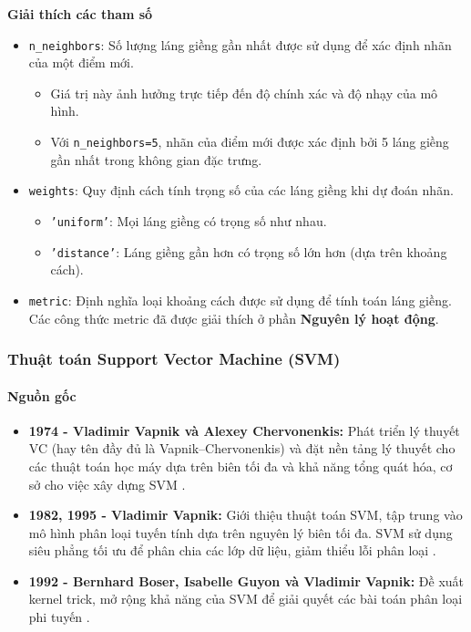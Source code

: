 \documentclass[a4paper,12pt]{article}
\begin{document}
\noindent \textbf{Giải thích các tham số}
\begin{itemize}
    \item \texttt{n\_neighbors}: Số lượng láng giềng gần nhất được sử dụng để xác định nhãn của một điểm mới.
    \begin{itemize}
        \item Giá trị này ảnh hưởng trực tiếp đến độ chính xác và độ nhạy của mô hình.
        \item Với \texttt{n\_neighbors=5}, nhãn của điểm mới được xác định bởi 5 láng giềng gần nhất trong không gian đặc trưng.
    \end{itemize}

    \item \texttt{weights}: Quy định cách tính trọng số của các láng giềng khi dự đoán nhãn.
    \begin{itemize}
        \item \texttt{'uniform'}: Mọi láng giềng có trọng số như nhau.
        \item \texttt{'distance'}: Láng giềng gần hơn có trọng số lớn hơn (dựa trên khoảng cách).
    \end{itemize}
    
    \item \texttt{metric}: Định nghĩa loại khoảng cách được sử dụng để tính toán láng giềng. Các công thức metric đã được giải thích ở phần \textbf{Nguyên lý hoạt động}.
\end{itemize}

\subsubsection{Thuật toán Support Vector Machine (SVM)}

\paragraph{Nguồn gốc}
\begin{itemize}
    \item \textbf{1974 - Vladimir Vapnik và Alexey Chervonenkis:} Phát triển lý thuyết VC (hay tên đầy đủ là Vapnik–Chervonenkis) và đặt nền tảng lý thuyết cho các thuật toán học máy dựa trên biên tối đa và khả năng tổng quát hóa, cơ sở cho việc xây dựng SVM \cite{vapnik1974}.
    \item \textbf{1982, 1995 - Vladimir Vapnik:} Giới thiệu thuật toán SVM, tập trung vào mô hình phân loại tuyến tính dựa trên nguyên lý biên tối đa. SVM sử dụng siêu phẳng tối ưu để phân chia các lớp dữ liệu, giảm thiểu lỗi phân loại \cite{vapnik1995}.
    \item \textbf{1992 - Bernhard Boser, Isabelle Guyon và Vladimir Vapnik:} Đề xuất kernel trick, mở rộng khả năng của SVM để giải quyết các bài toán phân loại phi tuyến \cite{boser1992}.
\end{itemize}
\end{document}
